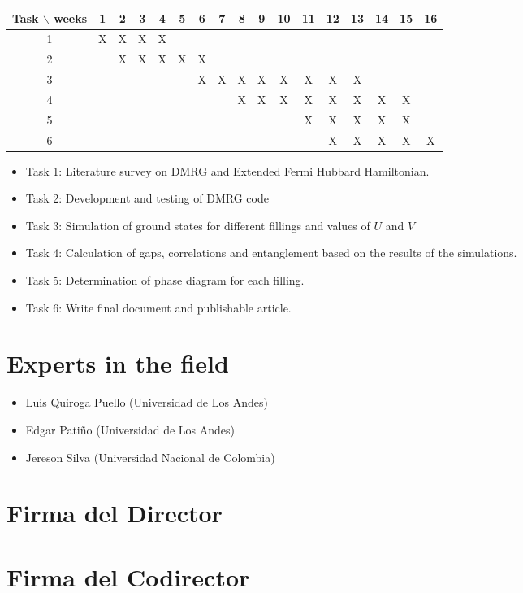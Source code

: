 \documentclass{article}
\begin{document}
\begin{table}[htb]
	\begin{tabular}{|c|cccccccccccccccc| }
	\hline
	Task $\backslash$ weeks & 1 & 2 & 3 & 4 & 5 & 6 & 7 & 8 & 9 & 10 & 11 & 12 & 13 & 14 & 15 & 16  \\
	\hline
	1 & X & X & X & X &   &   &   &  &  &   &   &   &   &   &   &   \\
	2 &   & X & X & X  & X & X &  &   &   &  &  &  &   &  &  &   \\
	3 &   &   &   &   &   & X  & X  & X & X  & X  & X  & X &  X &   &  &   \\
	4 &  &  &  &  &  &  &  & X & X & X &  X & X  &  X & X  &  X &   \\
	5 &   &   &   &   &  &   &   &   &  & &  X & X &  X & X & X &   \\
	6 &   &   &   &   &  &   &   &   &  &   &   & X &  X & X  & X & X  \\
	\hline
	\end{tabular}
\end{table}
\vspace{1mm}

\begin{itemize}
	\item Task 1: Literature survey on DMRG and Extended Fermi Hubbard Hamiltonian.
	\item Task 2: Development and testing of DMRG code 
	\item Task 3: Simulation of ground states for different fillings and values of $U$ and $V$
	\item Task 4: Calculation of gaps, correlations and entanglement based on the results of the simulations.
	\item Task 5: Determination of phase diagram for each filling.
	\item Task 6: Write final document and publishable article.
\end{itemize}

\section{Experts in the field}

\begin{itemize}
    \item Luis Quiroga Puello (Universidad de Los Andes)
    \item Edgar Patiño (Universidad de Los Andes)
    \item Jereson Silva (Universidad Nacional de Colombia)
\end{itemize}

\section*{Firma del Director}
\vspace{1.5cm}

\section*{Firma del Codirector}
\vspace{1.5cm}



\end{document}
